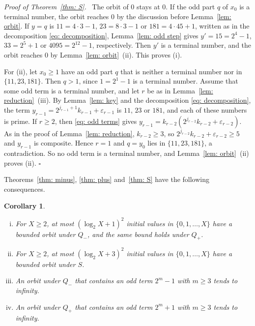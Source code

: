 \documentclass{article}
\newtheorem{corollary}{Corollary}
\newenvironment{proof}[1][Proof]{\par\medskip\noindent\textit{#1.}\ }{\hfill$\square$\par\medskip}
\newcommand{\Ge}{\geqslant}
\begin{document}
\begin{proof}[Proof of Theorem~\ref{thm: S}]
    The orbit of $0$ stays at $0$. If the odd part $q$ of $x_0$ is a terminal number, the orbit reaches $0$ by the discussion before Lemma~\ref{lem: orbit}. If $y = q$ is $11 = 4 \cdot 3 - 1$, $23 = 8 \cdot 3 - 1$ or $181 = 4 \cdot 45 + 1$, written as in the decomposition \eqref{eq: decomposition}, Lemma~\ref{lem: odd step} gives $y' = 15 = 2^4 - 1$, $33 = 2^5 + 1$ or $4095 = 2^{12} - 1$, respectively. Then $y'$ is a terminal number, and the orbit reaches $0$ by Lemma~\ref{lem: orbit}~(ii). This proves (i).

    For (ii), let $x_0 \Ge 1$ have an odd part $q$ that is neither a terminal number nor in $\{11, 23, 181\}$. Then $q > 1$, since $1 = 2^1 - 1$ is a terminal number. Assume that some odd term is a terminal number, and let $r$ be as in Lemma~\ref{lem: reduction}~(iii). By Lemma~\ref{lem: key} and the decomposition \eqref{eq: decomposition}, the term $y_{r-1} = 2^{j_{r-1} + 1} k_{r-1} + \varepsilon_{r-1}$ is $11$, $23$ or $181$, and each of these numbers is prime. If $r \Ge 2$, then \eqref{eq: odd terms} gives $y_{r-1} = k_{r-2} (2^{j_{r-2}} k_{r-2} + \varepsilon_{r-2})$. As in the proof of Lemma~\ref{lem: reduction}, $k_{r-2} \Ge 3$, so $2^{j_{r-2}} k_{r-2} + \varepsilon_{r-2} \Ge 5$ and $y_{r-1}$ is composite. Hence $r = 1$ and $q = y_0$ lies in $\{11, 23, 181\}$, a contradiction. So no odd term is a terminal number, and Lemma~\ref{lem: orbit}~(ii) proves (ii).
\end{proof}

Theorems~\ref{thm: minus}, \ref{thm: plus} and~\ref{thm: S} have the following consequences.

\begin{corollary}
\label{cor: bounded}
    \begin{enumerate}[(i)]
        \setlength{\itemsep}{0pt}
        \item For $X \Ge 2$, at most $(\log_2 X + 1)^2$ initial values in $\{0, 1, \dots, X\}$ have a bounded orbit under $Q_-$, and the same bound holds under $Q_+$.
        \item For $X \Ge 2$, at most $(\log_2 X + 3)^2$ initial values in $\{0, 1, \dots, X\}$ have a bounded orbit under $S$.
        \item An orbit under $Q_-$ that contains an odd term $2^m - 1$ with $m \Ge 3$ tends to infinity.
        \item An orbit under $Q_+$ that contains an odd term $2^m + 1$ with $m \Ge 3$ tends to infinity.
    \end{enumerate}
\end{corollary}
\end{document}
